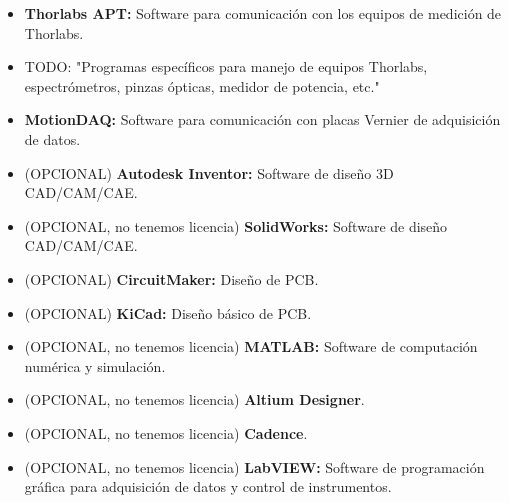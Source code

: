 \begin{itemize}
\begin{itemize}
    \end{itemize}
    \item \textbf{Thorlabs APT:} Software para comunicación con los equipos de medición de Thorlabs.
    \item TODO: "Programas específicos para manejo de equipos Thorlabs, espectrómetros, pinzas ópticas, medidor de potencia, etc."
    \item \textbf{MotionDAQ:} Software para comunicación con placas Vernier de adquisición de datos.
    \item (OPCIONAL) \textbf{Autodesk Inventor:} Software de diseño 3D CAD/CAM/CAE.
    \item (OPCIONAL, no tenemos licencia) \textbf{SolidWorks:} Software de diseño CAD/CAM/CAE.
    \item (OPCIONAL) \textbf{CircuitMaker:} Diseño de PCB.
    \item (OPCIONAL) \textbf{KiCad:} Diseño básico de PCB.
    \item (OPCIONAL, no tenemos licencia) \textbf{MATLAB:} Software de computación numérica y simulación.
    \item (OPCIONAL, no tenemos licencia) \textbf{Altium Designer}.
    \item (OPCIONAL, no tenemos licencia) \textbf{Cadence}.
    \item (OPCIONAL, no tenemos licencia) \textbf{LabVIEW:} Software de programación gráfica para adquisición de datos y control de instrumentos.
\end{itemize}
